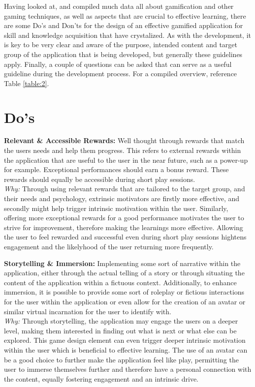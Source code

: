 Having looked at, and compiled much data all about gamification and other gaming techniques, as well as aspects that are crucial to effective learning, there are some Do's and Don'ts for the design of an effective gamified application for skill and knowledge acquisition that have crystalized. As with the development, it is key to be very clear and aware of the purpose, intended content and target group of the application that is being developed, but generally these guidelines apply. Finally, a couple of questions can be asked that can serve as a useful guideline during the development process. For a compiled overview, reference Table \ref{table:2}.

\section*{Do's} \indent
\textbf{Relevant \& Accessible Rewards:}
Well thought through rewards that match the users needs and help them progress. This refers to external rewards within the application that are useful to the user in the near future, such as a power-up for example. Exceptional performances should earn a bonus reward. These rewards should equally be accessible during short play sessions. \\ \indent
\textit{Why:} Through using relevant rewards that are tailored to the target group, and their needs and psychology, extrinsic motivators are firstly more effective, and secondly might help trigger intrinsic motivation within the user. Similarly, offering more exceptional rewards for a good performance motivates the user to strive for improvement, therefore making the learnings more effective. Allowing the user to feel rewarded and successful even during short play sessions hightens engagement and the likelyhood of the user returning more frequently.

\textbf{Storytelling \& Immersion:}
Implementing some sort of narrative within the application, either through the actual telling of a story or through situating the content of the application within a fictuous context. Additionally, to enhance immersion, it is possible to provide some sort of roleplay or fictious interactions for the user within the application or even allow for the creation of an avatar or similar virtual incarnation for the user to identify with. \\ \indent
\textit{Why:} Through storytelling, the application may engage the users on a deeper level, making them interested in finding out what is next or what else can be explored. This game design element can even trigger deeper intrinsic motivation within the user which is beneficial to effective learning. The use of an avatar can be a good choice to further make the application feel like play, permitting the user to immerse themselves further and therefore have a personal connection with the content, equally fostering engagement and an intrinsic drive.

